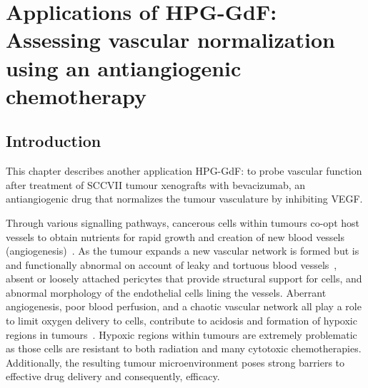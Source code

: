 
\chapter{Applications of \acs{HPG-GdF}: Assessing vascular normalization using an antiangiogenic chemotherapy}
\label{ch:HPG3}

\section{Introduction}

This chapter describes another application \acs{HPG-GdF}: to probe vascular function after treatment of SCCVII tumour xenografts with bevacizumab, an antiangiogenic drug that normalizes the tumour vasculature by inhibiting \acs{VEGF}.

Through various signalling pathways, cancerous cells within tumours co-opt host vessels to obtain nutrients for rapid growth and creation of new blood vessels (angiogenesis)~\cite{Jain:2005gk}.
As the tumour expands a new vascular network is formed but is  and functionally abnormal on account of leaky and tortuous blood vessels~\cite{McDonald:2002ut}, absent or loosely attached pericytes that provide structural support for cells, and abnormal morphology of the endothelial cells lining the vessels. 
Aberrant angiogenesis, poor blood perfusion, and a chaotic vascular network all play a role to limit oxygen delivery to cells, contribute to acidosis and formation of hypoxic regions in tumours~\cite{Jain:2005gk}.
Hypoxic regions within tumours are extremely problematic as those cells are resistant to both radiation and many cytotoxic chemotherapies.
Additionally, the resulting tumour microenvironment poses strong barriers to effective drug delivery and consequently, efficacy. 

